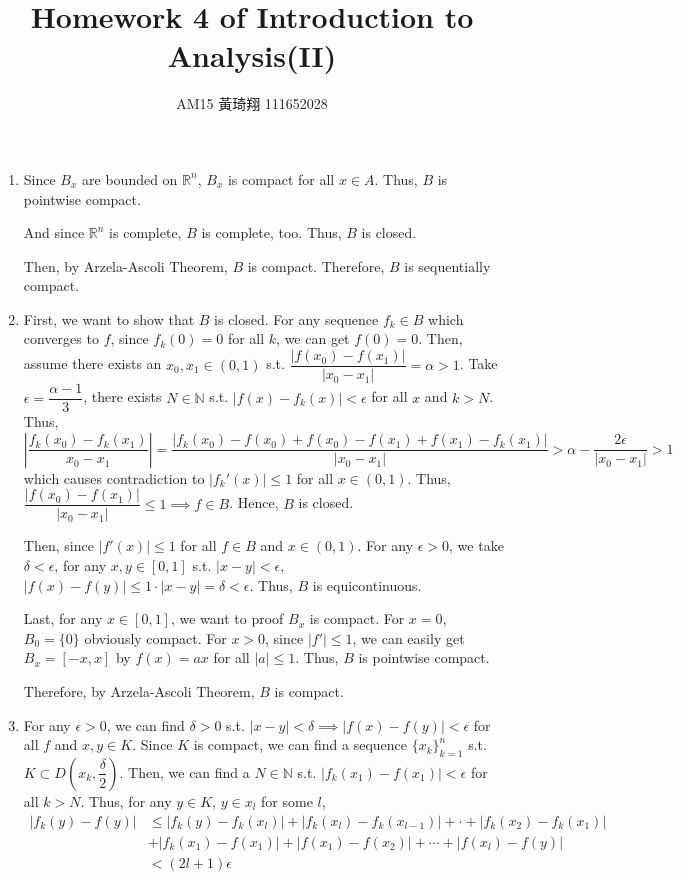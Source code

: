 \documentclass[12pt]{article}
\title{Homework 4 of Introduction to Analysis(II)}
\author{AM15 黃琦翔 111652028}
\begin{document}
\maketitle
\begin{enumerate}
    \item Since $B_x$ are bounded on $\mathbb{R}^n$, $B_x$ is compact for all $x\in A$.
    Thus, $B$ is pointwise compact.

    And since $\mathbb{R}^n$ is complete, $B$ is complete, too.
    Thus, $B$ is closed.

    Then, by Arzela-Ascoli Theorem, $B$ is compact.
    Therefore, $B$ is sequentially compact.

    \item First, we want to show that $B$ is closed.
    For any sequence $f_k \in B$ which converges to $f$, 
    since $f_k(0) = 0$ for all $k$, we can get $f(0) = 0$.
    Then, assume there exists an $x_0, x_1 \in (0, 1)$ s.t. $\dfrac{|f(x_0) - f(x_1)|}{|x_0 - x_1|} = \alpha > 1$.
    Take $\epsilon = \dfrac{\alpha-1}{3}$, there exists $N \in \mathbb{N}$ s.t. $|f(x) - f_k(x)| < \epsilon$ for all $x$ and $k > N$.
    Thus, $|\dfrac{f_k(x_0) - f_k(x_1)}{x_0 - x_1}| = \dfrac{|f_k(x_0) - f(x_0) + f(x_0) - f(x_1) + f(x_1) - f_k(x_1)|}{|x_0 - x_1|} > \alpha - \dfrac{2\epsilon}{|x_0 - x_1|} > 1$ 
    which causes contradiction to $|f_k'(x)| \leq 1$ for all $x\in (0, 1)$.
    Thus, $\dfrac{|f(x_0) - f(x_1)|}{|x_0 - x_1|} \leq 1\implies f\in B$.
    Hence, $B$ is closed.
    
    Then, since $|f'(x)| \leq 1$ for all $f\in B$ and $x\in (0, 1)$.
    For any $\epsilon > 0$, we take $\delta < \epsilon$,
    for any $x, y \in [0, 1]$ s.t. $|x - y| < \epsilon$, 
    $|f(x) - f(y)| \leq 1 \cdot |x-y| = \delta < \epsilon$.
    Thus, $B$ is equicontinuous.

    Last, for any $x \in [0, 1]$, we want to proof $B_x$ is compact.
    For $x = 0$, $B_0 = \{ 0\}$ obviously compact.
    For $x > 0$, since $|f'|\leq 1$, we can easily get $B_x = [-x, x]$ by $f(x) = ax$ for all $|a| \leq 1$.
    Thus, $B$ is pointwise compact.

    Therefore, by Arzela-Ascoli Theorem, $B$ is compact.

    \item For any $\epsilon > 0$, we can find $\delta > 0$ s.t. $|x-y| < \delta\implies |f(x) - f(y)| < \epsilon$ for all $f$ and $x, y \in K$.
    Since $K$ is compact, we can find a sequence $\{ x_k\}_{k=1}^n$ s.t. $K \subset D(x_k, \dfrac{\delta}{2})$.
    Then, we can find a $N \in \mathbb{N}$ s.t. $|f_k(x_1) - f(x_1)| < \epsilon$ for all $k > N$.
    Thus, for any $y \in K$, $y \in x_l$ for some $l$, \begin{align*}
        |f_k(y) - f(y)| &\leq |f_k(y) - f_k(x_l)| + |f_k(x_l) - f_k(x_{l-1})| + \cdot + |f_k(x_2) - f_k(x_1)|\\
        & + |f_k(x_1) - f(x_1)| + |f(x_1) - f(x_2)| + \cdots + |f(x_l) - f(y)|\\
        &< (2l+1)\epsilon
    \end{align*}



\end{enumerate}
\end{document}
